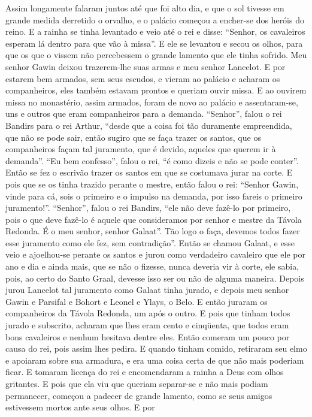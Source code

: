 Assim longamente falaram juntos até que foi alto dia, e que o sol tivesse em
grande medida derretido o orvalho, e o palácio começou a encher-se dos heróis
do reino. E a rainha se tinha levantado e veio até o rei e disse: “Senhor, os
cavaleiros esperam lá dentro para que vão à missa”. E ele se levantou e secou
os olhos, para que os que o vissem não percebessem o grande lamento que ele
tinha sofrido. Meu senhor Gawin deixou trazerem-lhe suas armas e meu senhor
Lancelot. E por estarem bem armados, sem seus escudos, e vieram ao
palácio e acharam os companheiros, eles também estavam prontos e queriam ouvir
missa. E ao ouvirem missa no monastério, assim armados, foram de novo ao
palácio e assentaram-se, uns e outros que eram companheiros para a demanda.
“Senhor”, falou o rei Bandirs para o rei Arthur, “desde que a coisa foi tão
duramente empreendida, que não se pode sair, então sugiro que se faça trazer os
santos, que os companheiros façam tal juramento, que é devido, aqueles que
querem ir à demanda”. “Eu bem confesso”, falou o rei, “é como dizeis e não se
pode conter”. Então se fez o escrivão trazer os santos em que se costumava
jurar na corte. E pois que se os tinha trazido perante o mestre, então falou o
rei: “Senhor Gawin, vinde para cá, sois o primeiro e o impulso na demanda, por
isso fareis o primeiro juramento!”. “Senhor”, falou o rei Bandirs, “ele não
deve fazê-lo por primeiro, pois o que deve fazê-lo é aquele que consideramos
por senhor e mestre da Távola Redonda. É o meu senhor, senhor Galaat”. Tão logo
o faça, devemos todos fazer esse juramento como ele fez, sem contradição”.
Então se chamou Galaat, e esse veio e ajoelhou-se perante os santos e jurou
como verdadeiro cavaleiro que ele por ano e dia e ainda mais, que se não o
fizesse, nunca deveria vir à corte, ele sabia, pois, ao certo do Santo Graal,
devesse isso ser ou não de alguma maneira. Depois jurou Lancelot tal
juramento como Galaat tinha jurado, e depois meu senhor Gawin e Parsifal e
Bohort e Leonel e Ylays, o Belo. E então juraram os companheiros da
Távola Redonda, um após o outro. E pois que tinham todos jurado e subscrito,
acharam que lhes eram cento e cinqüenta, que todos eram bons cavaleiros e
nenhum hesitava dentre eles. Então comeram um pouco por causa do rei, pois
assim lhes pedira. E quando tinham comido, retiraram seu elmo e apoiaram sobre
sua armadura, e era uma coisa certa de que não mais poderiam ficar. E tomaram
licença do rei e encomendaram a rainha a Deus com olhos gritantes. E pois que
ela viu que queriam separar-se e não mais podiam permanecer, começou a padecer
de grande lamento, como se seus amigos estivessem mortos ante seus olhos. E por
